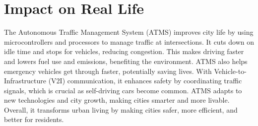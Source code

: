 \documentclass{scrreprt}
\begin{document}
\section*{Impact on Real Life}
The Autonomous Traffic Management System (ATMS) improves city life by using microcontrollers and processors to manage traffic at intersections. It cuts down on idle time and stops for vehicles, reducing congestion. This makes driving faster and lowers fuel use and emissions, benefiting the environment. ATMS also helps emergency vehicles get through faster, potentially saving lives. With Vehicle-to-Infrastructure (V2I) communication, it enhances safety by coordinating traffic signals, which is crucial as self-driving cars become common. ATMS adapts to new technologies and city growth, making cities smarter and more livable. Overall, it transforms urban living by making cities safer, more efficient, and better for residents.
\end{document}
